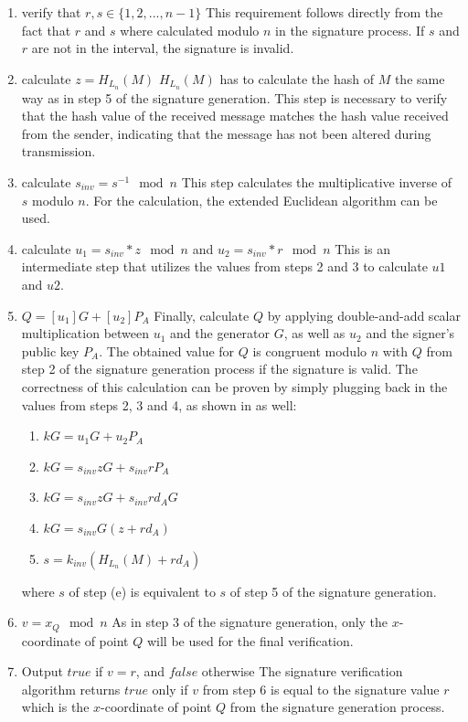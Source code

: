 	\begin{enumerate}
	\item verify that $r, s \in \{1, 2, ..., n -1\}$\newline
	This requirement follows directly from the fact that $r$ and $s$ where calculated modulo $n$ in the signature process. If $s$ and $r$ are not in the interval, the signature is invalid.
	\item calculate $z = H_{L_n}(M)$\newline
	$H_{L_n}(M)$ has to calculate the hash of $M$ the same way as in step 5 of the signature generation. This step is necessary to verify that the hash value of the received message matches the hash value received from the sender, indicating that the message has not been altered during transmission.
	\item calculate $s_{inv} = s^{-1} \mod{n}$\newline
	This step calculates the multiplicative inverse of $s$ modulo $n$. For the calculation, the extended Euclidean algorithm can be used.
	\item calculate $u_1=s_{inv} *  z \mod{n}$ and $ u_2 = s_{inv} * r \mod{n}$\newline
	This is an intermediate step that utilizes the values from steps 2 and 3 to calculate $u1$ and $u2$.
	\item $Q = [u_1]G + [u_2]P_A$\newline
	Finally, calculate $Q$ by applying double-and-add scalar multiplication between $u_1$ and the generator $G$, as well as $u_2$ and the signer's public key $P_A$. The obtained value for $Q$ is congruent modulo $n$ with $Q$ from step 2 of the signature generation process if the signature is valid.
	The correctness of this calculation can be proven by simply plugging back in the values from steps 2, 3 and 4, as shown in \cite{9422589} as well:
	\begin{enumerate}
	\item $kG = u_1G + u_2P_A$
	\item $kG = s_{inv}zG + s_{inv}rP_A$
	\item $kG = s_{inv}zG + s_{inv}rd_AG$
	\item $kG = s_{inv}G(z + rd_A)$
	\item $s = k_{inv}(H_{L_n}(M) + rd_A)$
	\end{enumerate}
	where $s$ of step (e) is equivalent to $s$ of step 5 of the signature generation.
	\item $v = x_Q \mod{n}$\newline
	As in step 3 of the signature generation, only the $x$-coordinate of point $Q$ will be used for the final verification.
	\item Output $true$ if $v =r$, and $false$ otherwise\newline
	The signature verification algorithm returns $true$ only if $v$ from step 6 is equal to the signature value $r$ which is the $x$-coordinate of point $Q$ from the signature generation process.
	\end{enumerate}

